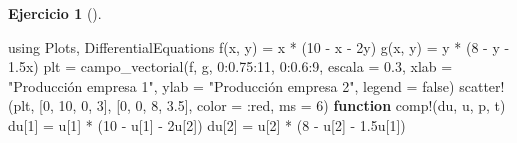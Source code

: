 \documentclass[
  spanish,
  a4paper,
]{scrreport}
\newenvironment{Shaded}{\begin{snugshade}}{\end{snugshade}}
\newcommand{\BuiltInTok}[1]{\textcolor[rgb]{0.00,0.23,0.31}{#1}}
\newcommand{\ConstantTok}[1]{\textcolor[rgb]{0.56,0.35,0.01}{#1}}
\newcommand{\FloatTok}[1]{\textcolor[rgb]{0.68,0.00,0.00}{#1}}
\newcommand{\FunctionTok}[1]{\textcolor[rgb]{0.28,0.35,0.67}{#1}}
\newcommand{\ImportTok}[1]{\textcolor[rgb]{0.00,0.46,0.62}{#1}}
\newcommand{\KeywordTok}[1]{\textcolor[rgb]{0.00,0.23,0.31}{\textbf{#1}}}
\newcommand{\NormalTok}[1]{\textcolor[rgb]{0.00,0.23,0.31}{#1}}
\newcommand{\OperatorTok}[1]{\textcolor[rgb]{0.37,0.37,0.37}{#1}}
\newcommand{\StringTok}[1]{\textcolor[rgb]{0.13,0.47,0.30}{#1}}
\theoremstyle{definition}
\newtheorem{exercise}{Ejercicio}[chapter]
\theoremstyle{remark}
\begin{document}
\begin{exercise}[]
\begin{enumerate}
  \begin{tcolorbox}[enhanced jigsaw, arc=.35mm, bottomrule=.15mm, bottomtitle=1mm, breakable, colback=white, colbacktitle=quarto-callout-tip-color!10!white, colframe=quarto-callout-tip-color-frame, coltitle=black, left=2mm, leftrule=.75mm, opacityback=0, opacitybacktitle=0.6, rightrule=.15mm, title=\textcolor{quarto-callout-tip-color}{\faLightbulb}\hspace{0.5em}{Solución}, titlerule=0mm, toprule=.15mm, toptitle=1mm]

\begin{Shaded}
\begin{Highlighting}[]
\ImportTok{using} \BuiltInTok{Plots}\NormalTok{, }\BuiltInTok{DifferentialEquations}
\FunctionTok{f}\NormalTok{(x, y) }\OperatorTok{=}\NormalTok{ x }\OperatorTok{*}\NormalTok{ (}\FloatTok{10} \OperatorTok{{-}}\NormalTok{ x }\OperatorTok{{-}} \FloatTok{2}\NormalTok{y)}
\FunctionTok{g}\NormalTok{(x, y) }\OperatorTok{=}\NormalTok{ y }\OperatorTok{*}\NormalTok{ (}\FloatTok{8} \OperatorTok{{-}}\NormalTok{ y }\OperatorTok{{-}} \FloatTok{1.5}\NormalTok{x)}
\NormalTok{plt }\OperatorTok{=} \FunctionTok{campo\_vectorial}\NormalTok{(f, g, }\FloatTok{0}\OperatorTok{:}\FloatTok{0.75}\OperatorTok{:}\FloatTok{11}\NormalTok{, }\FloatTok{0}\OperatorTok{:}\FloatTok{0.6}\OperatorTok{:}\FloatTok{9}\NormalTok{, escala }\OperatorTok{=} \FloatTok{0.3}\NormalTok{,}
\NormalTok{    xlab }\OperatorTok{=} \StringTok{"Producción empresa 1"}\NormalTok{, ylab }\OperatorTok{=} \StringTok{"Producción empresa 2"}\NormalTok{,}
\NormalTok{    legend }\OperatorTok{=} \ConstantTok{false}\NormalTok{)}
\FunctionTok{scatter!}\NormalTok{(plt, [}\FloatTok{0}\NormalTok{, }\FloatTok{10}\NormalTok{, }\FloatTok{0}\NormalTok{, }\FloatTok{3}\NormalTok{], [}\FloatTok{0}\NormalTok{, }\FloatTok{0}\NormalTok{, }\FloatTok{8}\NormalTok{, }\FloatTok{3.5}\NormalTok{], color }\OperatorTok{=} \OperatorTok{:}\NormalTok{red, ms }\OperatorTok{=} \FloatTok{6}\NormalTok{)}
\KeywordTok{function} \FunctionTok{comp!}\NormalTok{(du, u, p, t)}
\NormalTok{    du[}\FloatTok{1}\NormalTok{] }\OperatorTok{=}\NormalTok{ u[}\FloatTok{1}\NormalTok{] }\OperatorTok{*}\NormalTok{ (}\FloatTok{10} \OperatorTok{{-}}\NormalTok{ u[}\FloatTok{1}\NormalTok{] }\OperatorTok{{-}} \FloatTok{2}\NormalTok{u[}\FloatTok{2}\NormalTok{])}
\NormalTok{    du[}\FloatTok{2}\NormalTok{] }\OperatorTok{=}\NormalTok{ u[}\FloatTok{2}\NormalTok{] }\OperatorTok{*}\NormalTok{ (}\FloatTok{8} \OperatorTok{{-}}\NormalTok{ u[}\FloatTok{2}\NormalTok{] }\OperatorTok{{-}} \FloatTok{1.5}\NormalTok{u[}\FloatTok{1}\NormalTok{])}

\end{Highlighting}
\end{Shaded}
\end{tcolorbox}
\end{enumerate}
\end{exercise}
\end{document}
